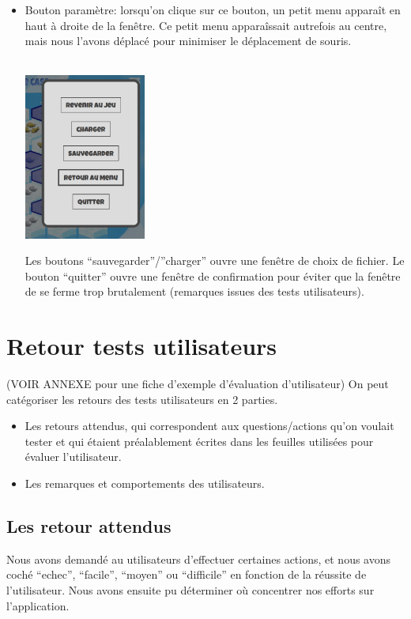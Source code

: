 \documentclass{report}
\begin{document}
\begin{itemize}
\item Bouton paramètre: lorsqu'on clique sur ce bouton, un petit menu apparaît en haut à droite de la fenêtre. Ce petit menu apparaîssait autrefois au centre, mais nous l'avons déplacé pour minimiser le déplacement de souris.
  \\
  \\
\begin{minipage}{0.3\linewidth}
    \includegraphics[width=4cm]{image/parametres.png}    
\end{minipage}\hfill
\begin{minipage}{0.7\linewidth}
    Les boutons ``sauvegarder''/''charger'' ouvre une fenêtre de choix de fichier. Le bouton ``quitter'' ouvre une fenêtre de confirmation pour éviter que la fenêtre de se ferme trop brutalement (remarques issues des tests utilisateurs).
  \end{minipage}
\end{itemize}

\section{Retour tests utilisateurs}
(VOIR ANNEXE pour une fiche d'exemple d'évaluation d'utilisateur)
On peut catégoriser les retours des tests utilisateurs en 2 parties.
\begin{itemize}
\item Les retours attendus, qui correspondent aux questions/actions qu'on voulait tester et qui étaient préalablement écrites dans les feuilles utilisées pour évaluer l'utilisateur.
\item Les remarques et comportements des  utilisateurs.
\end{itemize}

\subsection{Les retour attendus}
Nous avons demandé au utilisateurs d'effectuer certaines actions, et nous avons coché ``echec'', ``facile'', ``moyen'' ou  ``difficile'' en fonction de la réussite de l'utilisateur. Nous avons ensuite pu déterminer où concentrer nos efforts sur l'application.
\end{document}
